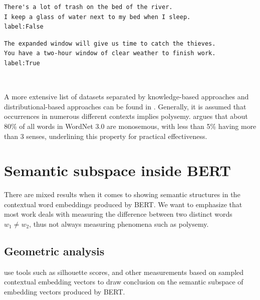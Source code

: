 \documentclass[a4paper,12pt,oneside,openright]{report}
\begin{document}
\begin{tcolorbox}
\begin{verbatim}
There's a lot of trash on the bed of the river.
I keep a glass of water next to my bed when I sleep.
label:False
\end{verbatim}
\end{tcolorbox}

\quad

\begin{tcolorbox}
\begin{verbatim}
The expanded window will give us time to catch the thieves.
You have a two-hour window of clear weather to finish work.
label:True
\end{verbatim} \\
\end{tcolorbox} 

A more extensive list of datasets separated by knowledge-based approaches and distributional-based approaches can be found in \cite{camachocollados18, liebeskind19, navigli19}.
Generally, it is assumed that occurrences in numerous different contexts implies polysemy.
\cite{camachocollados18} argues that about 80\% of all words in WordNet  3.0 are monosemous, with less than 5\% having more than 3 senses, underlining this property for practical effectiveness. \\

\section{Semantic subspace inside BERT}

There are mixed results when it comes to showing semantic structures in the contextual word embeddings produced by BERT.
We want to emphasize that most work deals with measuring the difference between two distinct words $w_1 \neq w_2$, thus not always measuring phenomena such as polysemy. 

\subsection{Geometric analysis}

\cite{ethayarajh19, mickus19} use tools such as silhouette scores, and other measurements based on sampled contextual embedding vectors to draw conclusion on the semantic subspace of embedding vectors produced by BERT.
\end{document}
